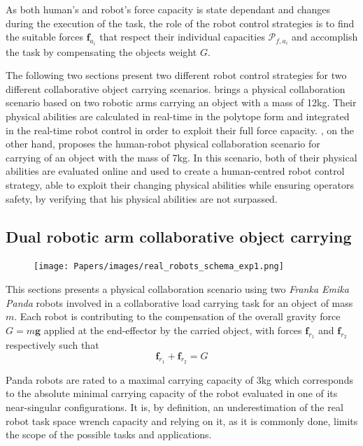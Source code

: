 As both human's and robot's force capacity is state dependant and changes during the execution of the task, the role of the robot control strategies is to find the suitable forces $\bm{f}_{a_i}$ that respect their individual capacities $\mathcal{P}_{f,a_i}$ and accomplish the task by compensating the objects weight $G$. 

The following two sections present two different robot control strategies for two different collaborative object carrying scenarios.  brings a physical collaboration scenario based on two robotic arms carrying an object with a mass of 12kg. Their physical abilities are calculated in real-time in the polytope form and integrated in the real-time robot control in order to exploit their full force capacity. , on the other hand, proposes the human-robot physical collaboration scenario for carrying of an object with the mass of 7kg. In this scenario, both of their physical abilities are evaluated online and used to create a human-centred robot control strategy, able to exploit their changing physical abilities while ensuring operators safety, by verifying that his physical abilities are not surpassed. 


\subsection{Dual robotic arm collaborative object carrying}
\label{ch:robot_robot_carrying}

\begin{figure}[!h]
    \centering
    \texttt{[image: Papers/images/real\_robots\_schema\_exp1.png]}
    \caption{}
    \label{fig:exp1_real_schema}
\end{figure}


This sections presents a physical collaboration scenario using two \textit{Franka Emika Panda} robots involved in a collaborative load carrying task for an object of mass $m$. Each robot is contributing to the compensation of the overall gravity force $G=m\bm{g}$ applied at the end-effector by the carried object, with forces $\bm{f}_{r_1}$ and $\bm{f}_{r_2}$ respectively such that
\begin{equation}
    \bm{f}_{r_1} + \bm{f}_{r_2} = G
\end{equation}

Panda robots are rated to a maximal carrying capacity of 3kg which corresponds to the absolute minimal carrying capacity of the robot evaluated in one of its near-singular configurations. It is, by definition, an underestimation of the real robot task space wrench capacity and relying on it, as it is commonly done, limits the scope of the possible tasks and applications.


